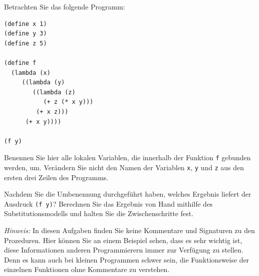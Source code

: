 \begin{aufgabe}
  Betrachten Sie das folgende Programm:

\begin{verbatim}
(define x 1)
(define y 3)
(define z 5)

(define f
  (lambda (x)   
     ((lambda (y)
        ((lambda (z)
           (+ z (* x y)))
         (+ x z)))
      (+ x y))))

(f y)
\end{verbatim}

  Benennen Sie hier alle lokalen Variablen, die innerhalb der Funktion
  \verb"f" gebunden werden, um. Verändern Sie nicht den Namen der
  Variablen \verb"x", \verb"y" und \verb"z" aus den ersten drei Zeilen
  des Programms.

  Nachdem Sie die Umbenennung durchgeführt haben, welches Ergebnis liefert
  der Ausdruck \verb"(f y)"? Berechnen Sie das Ergebnis von Hand mithilfe
  des Substitutionsmodells und halten Sie die Zwischenschritte fest.

  \noindent \emph{Hinweis:} In diesen Aufgaben finden Sie keine
  Kommentare und Signaturen zu den Prozeduren. Hier können Sie an einem
  Beispiel sehen, dass es sehr wichtig ist, diese Informationen
  anderen Programmierern immer zur Verfügung zu stellen. Denn es kann
  auch bei kleinen Programmen schwer sein, die Funktionsweise der
  einzelnen Funktionen ohne Kommentare zu verstehen.
\end{aufgabe}

